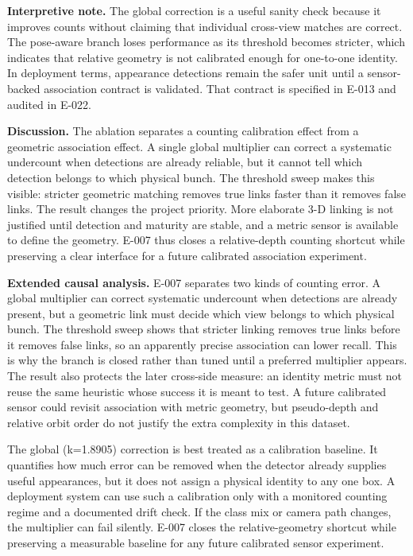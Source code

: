 \documentclass[preprint,12pt]{elsarticle}
\begin{document}
\textbf{Interpretive note.} The global correction is a useful sanity check
because it improves counts without claiming that individual cross-view
matches are correct. The pose-aware branch loses performance as its threshold
becomes stricter, which indicates that relative geometry is not calibrated
enough for one-to-one identity. In deployment terms, appearance detections
remain the safer unit until a sensor-backed association contract is validated.
That contract is specified in E-013 and audited in E-022.

\textbf{Discussion.} The ablation separates a counting calibration effect from
a geometric association effect. A single global multiplier can correct a
systematic undercount when detections are already reliable, but it cannot tell
which detection belongs to which physical bunch. The threshold sweep makes
this visible: stricter geometric matching removes true links faster than it
removes false links. The result changes the project priority. More elaborate
3-D linking is not justified until detection and maturity are stable, and a
metric sensor is available to define the geometry. E-007 thus closes a
relative-depth counting shortcut while preserving a clear interface for a
future calibrated association experiment.

\textbf{Extended causal analysis.} E-007 separates two kinds of counting
error. A global multiplier can correct systematic undercount when detections
are already present, but a geometric link must decide which view belongs to
which physical bunch. The threshold sweep shows that stricter linking removes
true links before it removes false links, so an apparently precise association
can lower recall. This is why the branch is closed rather than tuned until a
preferred multiplier appears. The result also protects the later cross-side
measure: an identity metric must not reuse the same heuristic whose success it
is meant to test. A future calibrated sensor could revisit association with
metric geometry, but pseudo-depth and relative orbit order do not justify the
extra complexity in this dataset.

The global (k=1.8905) correction is best treated as a calibration baseline.
It quantifies how much error can be removed when the detector already supplies
useful appearances, but it does not assign a physical identity to any one
box. A deployment system can use such a calibration only with a monitored
counting regime and a documented drift check. If the class mix or camera path
changes, the multiplier can fail silently. E-007 closes the relative-geometry
shortcut while preserving a measurable baseline for any future calibrated
sensor experiment.
\end{document}
